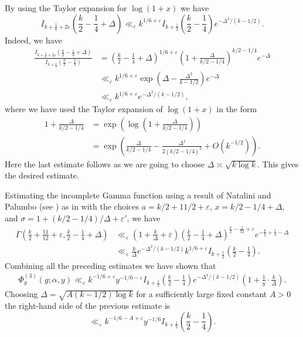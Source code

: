 \documentclass[a4paper,10pt,twoside]{amsart}
\theoremstyle{definition}
\numberwithin{equation}{section}
\newcommand\eps{\varepsilon}
\renewcommand\:{\colon}
\begin{document}
By using the Taylor expansion for $\log(1+x)$ we have 
\[I_{k+\frac56+2\varepsilon}\left(\frac k2-\frac14+\Delta\right)\ll_\eps k^{1/6+\varepsilon}I_{k+\frac12}\left(\frac k2-\frac14\right)e^{-\Delta^2/(k-1/2)}.\]
Indeed, we have
\begin{align*}
\frac{I_{k+\frac56+2\varepsilon}\left(\frac k2-\frac14+\Delta\right)}{I_{k+\frac12}\left(\frac k2-\frac14\right)}&=\left(\frac k2-\frac14+\Delta\right)^{1/6+\varepsilon}\left(1+\frac\Delta{k/2-1/4}\right)^{k/2-1/4}e^{-\Delta}\\
&\ll_\eps k^{1/6+\varepsilon}\exp\left(\Delta-\frac{\Delta^2}{k-1/2}\right)e^{-\Delta}\\
&\ll_\eps k^{1/6+\varepsilon}e^{-\Delta^2/(k-1/2)},
\end{align*}
where we have used the Taylor expansion of $\log(1+x)$ in the form
\begin{align*} 
1+\frac\Delta{k/2-1/4}&=\exp\left(\log\left(1+\frac\Delta{k/2-1/4}\right)\right)\\
&=\exp\left(\frac\Delta{k/2-1/4}-\frac{\Delta^2}{2(k/2-1/4)^2}+O\left(k^{-1/2}\right)\right).
\end{align*}
Here the last estimate follows as we are going to choose $\Delta\asymp\sqrt{k\log k}$. This gives the desired estimate.

Estimating the incomplete Gamma function using a result of Natalini and Palumbo (see \cite{Natalini-Palumbo2000}) as in \cite{Ghosh-Sarnak2012} with the choices $a=k/2+11/2+\eps$, $x=k/2-1/4+\Delta$, and $\sigma=1+(k/2-1/4)/\Delta+\eps'$, we have 
\begin{align*}\Gamma\left(\frac k2+\frac{11}{12}+\varepsilon,\frac k2-\frac14+\Delta\right)&\ll_\eps\left(1+\frac k\Delta+\eps\right)\left(\frac k2-\frac14+\Delta\right)^{\frac k2-\frac1{12}+\eps}e^{-\frac k2+\frac14-\Delta}\\
& \ll_\eps\frac k\Delta e^{-\Delta^2/(k-1/2)}k^{1/6+\varepsilon} I_{k+\frac12}\left(\frac k2-\frac14\right).
\end{align*}
\noindent Combining all the preceding estimates we have shown that
\begin{align*}
\Phi_g^{(3)}(g;\alpha,y)\ll_\eps k^{-1/6+\varepsilon}y^{-1/6-\varepsilon}I_{k+\frac12}\left(\frac k2-\frac14\right)e^{-\Delta^2/(k-1/2)}\left(1+\frac1y\cdot\frac k\Delta\right).  
\end{align*}
Choosing $\Delta=\sqrt{A(k-1/2)\log k}$ for a sufficiently large fixed constant $A>0$ the right-hand side of the previous estimate is
\[\ll_\eps k^{-1/6-A+\varepsilon}y^{-1/6}I_{k+\frac12}\left(\frac k2-\frac14\right).\]
\end{document}
